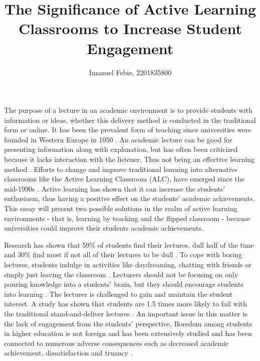 \documentclass[12pt]{article}
\begin{document}
\title{The Significance of Active Learning Classrooms to Increase Student Engagement}
\author{Imanuel Febie, 2201835800}

\maketitle

The purpose of a lecture in an academic environment is to provide students with information or ideas, whether this delivery method is conducted in the traditional form or online. It has been the prevalent form of teaching since universities were founded in Western Europe in 1050 \cite{bajak2014lectures}. An academic lecture can be good for presenting information along with explanation, but has often been criticized because it lacks interaction with the listener. Thus not being an effective learning method \cite{what-students-want}. Efforts to change and improve traditional learning into alternative classrooms like the Active Learning Classroom (ALC), have emerged since the mid-1990s \cite{guide-to-teaching-alc}. Active learning has shown that it can increase the students' enthusiasm, thus having a positive effect on the students' academic achievements. This essay will present two possible solutions in the realm of active learning environments - that is, learning by teaching and the flipped classroom - because universities could improve their students academic achievements.

Research has shown that 59\% of students find their lectures, dull half of the time and 30\% find most if not all of their lectures to be dull \cite{boredom-among-students}. To cope with boring lectures, students indulge in activities like daydreaming, chatting with friends or simply just leaving the classroom \cite{predictors-of-boredom}. Lecturers should not be focusing on only pouring knowledge into a students' brain, but they should encourage students into learning \cite{satisfaction-active-learning}. The lecturer is challenged to gain and maintain the student interest. A study has shown that students are 1.5 times more likely to fail with the traditional stand-and-deliver lectures \cite{freeman-active-learning-2014}. An important issue in this matter is the lack of engagement from the students' perspective. Boredom among students in higher education is not foreign and has been extensively studied and has been connected to numerous adverse consequences such as decreased academic achievement, dissatisfaction and truancy \cite{boredom-among-students}. 
\end{document}
